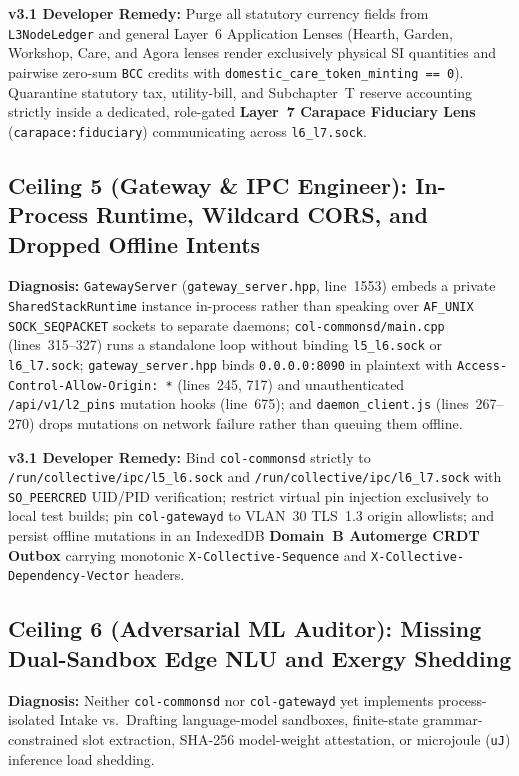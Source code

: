\textbf{v3.1 Developer Remedy:} Purge all statutory currency fields from \texttt{L3NodeLedger} and general Layer~6 Application Lenses (Hearth, Garden, Workshop, Care, and Agora lenses render exclusively physical SI quantities and pairwise zero-sum \texttt{BCC} credits with \texttt{domestic\_care\_token\_minting == 0}). Quarantine statutory tax, utility-bill, and Subchapter~T reserve accounting strictly inside a dedicated, role-gated \textbf{Layer~7 Carapace Fiduciary Lens} (\texttt{carapace:fiduciary}) communicating across \texttt{l6\_l7.sock}.

\subsection{Ceiling 5 (Gateway \& IPC Engineer): In-Process Runtime, Wildcard CORS, and Dropped Offline Intents}
\textbf{Diagnosis:} \texttt{GatewayServer} (\texttt{gateway\_server.hpp}, line~1553) embeds a private \texttt{SharedStackRuntime} instance in-process rather than speaking over \texttt{AF\_UNIX} \texttt{SOCK\_SEQPACKET} sockets to separate daemons; \texttt{col-commonsd/main.cpp} (lines~315--327) runs a standalone loop without binding \texttt{l5\_l6.sock} or \texttt{l6\_l7.sock}; \texttt{gateway\_server.hpp} binds \texttt{0.0.0.0:8090} in plaintext with \texttt{Access-Control-Allow-Origin: *} (lines~245, 717) and unauthenticated \texttt{/api/v1/l2\_pins} mutation hooks (line~675); and \texttt{daemon\_client.js} (lines~267--270) drops mutations on network failure rather than queuing them offline.

\textbf{v3.1 Developer Remedy:} Bind \texttt{col-commonsd} strictly to \texttt{/run/collective/ipc/l5\_l6.sock} and \texttt{/run/collective/ipc/l6\_l7.sock} with \texttt{SO\_PEERCRED} UID/PID verification; restrict virtual pin injection exclusively to local test builds; pin \texttt{col-gatewayd} to VLAN~30 TLS~1.3 origin allowlists; and persist offline mutations in an IndexedDB \textbf{Domain~B Automerge CRDT Outbox} carrying monotonic \texttt{X-Collective-Sequence} and \texttt{X-Collective-Dependency-Vector} headers.

\subsection{Ceiling 6 (Adversarial ML Auditor): Missing Dual-Sandbox Edge NLU and Exergy Shedding}
\textbf{Diagnosis:} Neither \texttt{col-commonsd} nor \texttt{col-gatewayd} yet implements process-isolated Intake vs.\ Drafting language-model sandboxes, finite-state grammar-constrained slot extraction, SHA-256 model-weight attestation, or microjoule (\texttt{uJ}) inference load shedding.

